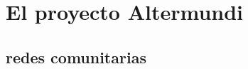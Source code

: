 \section{El proyecto Altermundi}

\subsection{redes comunitarias}

\begin{comment}
redes convencionales: organizadas de manera jerárquica (Telematik heranziehen?):
topología centralizada: el nodo en el centro tiene control/papel clave: si falla, toda la red se desmantela.

redes mesh: cada nodo está conectado con más de 1 otro: topología más perdurable/estable; todos los nodos son iguales;
full mesh: cada nodo está conectado directamente con cada otro: la red falla si todos los nodos fallan --> grande capacidad de recuperación

redes comunitarias: son en general redes mesh con una pretención política
características:
* infraestructura de comunicación decentralizada, creada y mantenida por la comunidad de lxs usuarixs (el estado/empresas grandes no pueden cerrarla tan facilmente) --> interesante sobre todo también para contextos autócratos (regimenes políticos antidemocráticos, vease Iran, China, Cuba, .. )
* garantizar acceso libre a información
* garantizar la libertad de expresión
* ..
* el firmware: software libre

      \item infraestructura de comunicación abierta, accesible para tod@s
      \item infraestructura creada y mantenida por la comunidad de l@s usuari@s
      \item ejemplos:
        \begin{itemize}
          \item Freifunk (Alemania)
          \item guifi.net (España/Cataluña)
          \item ninux (Italia)
          \item Funkfeuer (Austria)
        \end{itemize}

  \begin{itemize}
    \item conectar a comunidades excluidas por los proveedores convencionales de servicios Internet
    \item garantizar acceso libre a información
    \item garantizar la libertad de expreción
    \item profundizar los propios conocimientos técnicos, experimentar
    \item educar y concienciar a más gente
  \end{itemize}


\end{comment}
